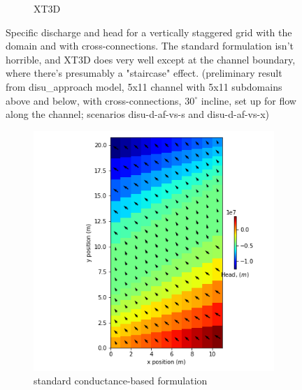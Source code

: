 \documentclass{article}
\begin{document}
\begin{figure}[H]
\begin{subfigure}{0.4\textwidth}
	\caption{XT3D}
	\label{fig:disu-x-cc-head}
\end{subfigure}
\caption{Specific discharge and head for a vertically staggered grid with the domain and with cross-connections. The standard formulation isn't horrible, and XT3D does very well except at the channel boundary, where there's presumably a "staircase" effect. (preliminary result from disu\_approach model, 5x11 channel with 5x11 subdomains above and below, with cross-connections, $30^{\circ}$ incline, set up for flow along the channel; scenarios disu-d-af-vs-s and disu-d-af-vs-x)}
\label{fig:figures}
\end{figure}

\begin{figure}[H]
\centering
\begin{subfigure}{0.4\textwidth}
	\includegraphics[width=\textwidth]{../figures/disu-d-cf-vs-s-head.png}
	\caption{standard conductance-based formulation}
	\label{fig:disu-s-cc-cf-head}
\end{subfigure}
\hfill
\begin{subfigure}{0.4\textwidth}

\end{subfigure}
\end{figure}
\end{document}

